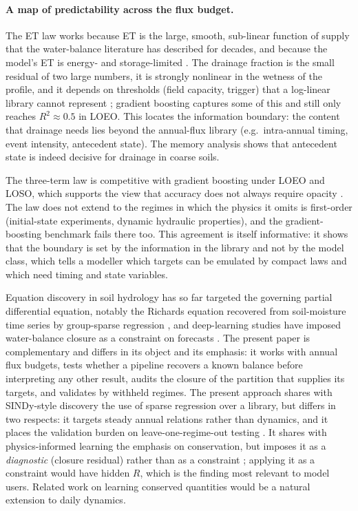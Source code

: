 \paragraph{A map of predictability across the flux budget.}
The ET law works because ET is the large, smooth, sub-linear function of supply that the water-balance literature has described for decades, and because the model's ET is energy- and storage-limited \citep{Budyko1974,Milly1994,Zhang2001}. The drainage fraction is the small residual of two large numbers, it is strongly nonlinear in the wetness of the profile, and it depends on thresholds (field capacity, trigger) that a log-linear library cannot represent \citep{Rodriguez2004}; gradient boosting captures some of this and still only reaches $R^2\approx0.5$ in LOEO. This locates the information boundary: the content that drainage needs lies beyond the annual-flux library (e.g.\ intra-annual timing, event intensity, antecedent state). The memory analysis shows that antecedent state is indeed decisive for drainage in coarse soils.

The three-term law is competitive with gradient boosting under LOEO and LOSO, which supports the view that accuracy does not always require opacity \citep{Rudin2019}. The law does not extend to the regimes in which the physics it omits is first-order (initial-state experiments, dynamic hydraulic properties), and the gradient-boosting benchmark fails there too. This agreement is itself informative: it shows that the boundary is set by the information in the library and not by the model class, which tells a modeller which targets can be emulated by compact laws and which need timing and state variables.

Equation discovery in soil hydrology has so far targeted the governing partial differential equation, notably the Richards equation recovered from soil-moisture time series by group-sparse regression \citep{Song2022,Song2025}, and deep-learning studies have imposed water-balance closure as a constraint on forecasts \citep{Li2024}. The present paper is complementary and differs in its object and its emphasis: it works with annual flux budgets, tests whether a pipeline recovers a known balance before interpreting any other result, audits the closure of the partition that supplies its targets, and validates by withheld regimes. The present approach shares with SINDy-style discovery \citep{Brunton2016} the use of sparse regression over a library, but differs in two respects: it targets steady annual relations rather than dynamics, and it places the validation burden on leave-one-regime-out testing \citep{Roberts2017}. It shares with physics-informed learning \citep{Raissi2019,Karniadakis2021} the emphasis on conservation, but imposes it as a \emph{diagnostic} (closure residual) rather than as a constraint \citep{Beucler2021}; applying it as a constraint would have hidden $R$, which is the finding most relevant to model users. Related work on learning conserved quantities \citep{Liu2021,Iten2020} would be a natural extension to daily dynamics.


